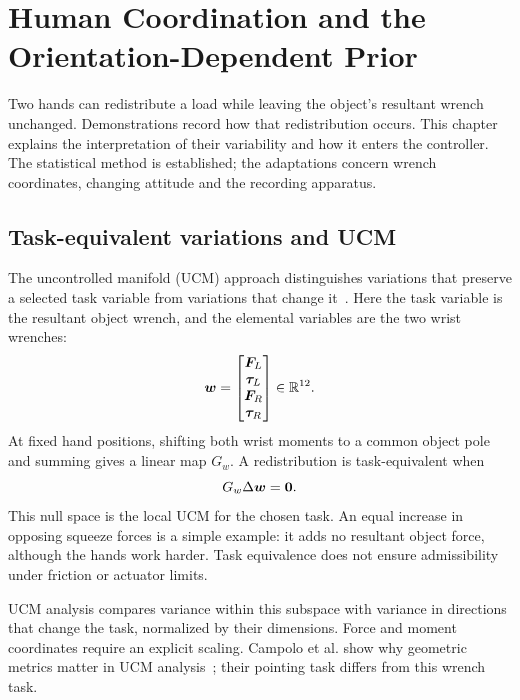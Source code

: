 \chapter{Human Coordination and the Orientation-Dependent Prior}
\label{ch:prior}

Two hands can redistribute a load while leaving the object's resultant wrench unchanged. Demonstrations record how that redistribution occurs. This chapter explains the interpretation of their variability and how it enters the controller. The statistical method is established; the adaptations concern wrench coordinates, changing attitude and the recording apparatus.

\section{Task-equivalent variations and UCM}
\label{sec:ucm-prior}

The uncontrolled manifold (UCM) approach distinguishes variations that preserve a selected task variable from variations that change it~\cite{scholz1999}. Here the task variable is the resultant object wrench, and the elemental variables are the two wrist wrenches:
\begin{equation}
\bm{w}=\begin{bmatrix}\bm{F}_L\\\bm{\tau}_L\\\bm{F}_R\\\bm{\tau}_R\end{bmatrix}\in\mathbb{R}^{12}.
\label{eq:wrench12}
\end{equation}
At fixed hand positions, shifting both wrist moments to a common object pole and summing gives a linear map $G_w$. A redistribution is task-equivalent when
\begin{equation}
G_w\Delta\bm{w}=\bm{0}.
\label{eq:ucm-wrench}
\end{equation}
This null space is the local UCM for the chosen task. An equal increase in opposing squeeze forces is a simple example: it adds no resultant object force, although the hands work harder. Task equivalence does not ensure admissibility under friction or actuator limits.

UCM analysis compares variance within this subspace with variance in directions that change the task, normalized by their dimensions. Force and moment coordinates require an explicit scaling. Campolo et al. show why geometric metrics matter in UCM analysis~\cite{campolo2013}; their pointing task differs from this wrench task.

